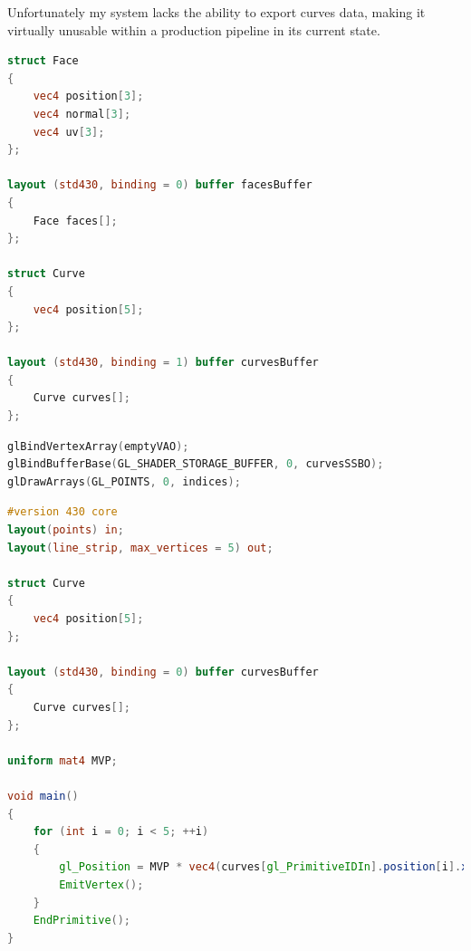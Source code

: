 \documentclass[]{acmsiggraph}
\begin{document}
Unfortunately my system lacks the ability to export curves data, making it virtually unusable within a production pipeline in its current state.




\newpage
\appendix

\begin{lstlisting}[language=GLSL, label={lst:buffers}, caption={Extract from the Distributor compute shader, showing how the Mesh and Curves buffers are accessed.}]
struct Face
{
	vec4 position[3];
	vec4 normal[3];
	vec4 uv[3];
};

layout (std430, binding = 0) buffer facesBuffer
{
	Face faces[];
};

struct Curve
{
	vec4 position[5];
};

layout (std430, binding = 1) buffer curvesBuffer
{
	Curve curves[];
};
\end{lstlisting}

\begin{lstlisting}[language=C++, label={lst:rendercpp}, caption={Extract from the C++ application code showing how Curves are rendered procedurally. \texttt{emptyVAO} is an empty Vertex Array Object, \texttt{curvesSSBO} is a \texttt{GL\_SHADER\_STORAGE\_BUFFER} containing vertex data for multiple curves, and \texttt{indices} is the number of curves in the buffer.}]
glBindVertexArray(emptyVAO);
glBindBufferBase(GL_SHADER_STORAGE_BUFFER, 0, curvesSSBO);
glDrawArrays(GL_POINTS, 0, indices);
\end{lstlisting}

\begin{lstlisting}[language=GLSL, label={lst:renderglsl}, caption={Extract from the curves rendering geometry shader, showing how vertex positions were processed from data stored in a bound \texttt{GL\_SHADER\_STORAGE\_BUFFER}.}]
#version 430 core
layout(points) in;
layout(line_strip, max_vertices = 5) out;

struct Curve
{
	vec4 position[5];
};

layout (std430, binding = 0) buffer curvesBuffer
{
	Curve curves[];
};

uniform mat4 MVP;

void main()
{
	for (int i = 0; i < 5; ++i)
	{
		gl_Position = MVP * vec4(curves[gl_PrimitiveIDIn].position[i].xyz, 1.0);
		EmitVertex();
	}
	EndPrimitive();
}
\end{lstlisting}
\end{document}
